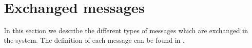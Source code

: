 \chapter{Exchanged messages}\label{ch:msgs}

In this section we describe the different types of messages which are exchanged
in the system. The definition of each message can be found in
.



